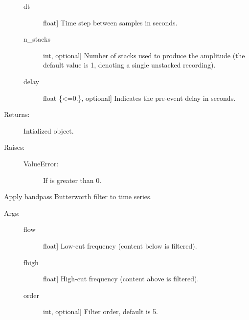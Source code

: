 \documentclass[letterpaper,10pt,english,openany,oneside]{sphinxmanual}
\begin{document}
\begin{fulllineitems}
\begin{fulllineitems}
\begin{description}
\begin{description}
\item[{dt}] \leavevmode{[}float{]}
Time step between samples in seconds.

\item[{n\_stacks}] \leavevmode{[}int, optional{]}
Number of stacks used to produce the amplitude (the
default value is 1, denoting a single unstacked 
recording).

\item[{delay}] \leavevmode{[}float \{\textless{}=0.\}, optional{]}
Indicates the pre-event delay in seconds.

\end{description}

\item[{Returns:}] \leavevmode
Intialized  object.

\item[{Raises:}] \leavevmode\begin{description}
\item[{ValueError:}] \leavevmode
If  is greater than 0.

\end{description}

\end{description}

\end{fulllineitems}


\begin{fulllineitems}
\label{\detokenize{index:sigpropy.TimeSeries.bandpassfilter}}
Apply bandpass Butterworth filter to time series.
\begin{description}
\item[{Args:}] \leavevmode\begin{description}
\item[{flow}] \leavevmode{[}float{]}
Low-cut frequency (content below  is filtered).

\item[{fhigh}] \leavevmode{[}float{]}
High-cut frequency (content above  is filtered).

\item[{order}] \leavevmode{[}int, optional{]}
Filter order, default is 5.

\end{description}


\end{description}
\end{fulllineitems}
\end{fulllineitems}
\end{document}
